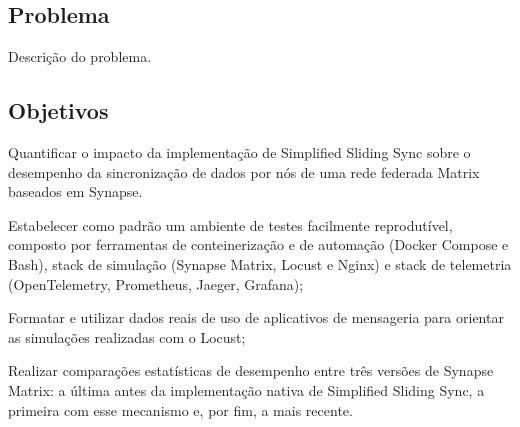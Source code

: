\subsection{Problema}

Descrição do problema.

\subsection{Objetivos}

Quantificar o impacto da implementação de Simplified Sliding Sync sobre o desempenho da sincronização de dados por nós de uma rede federada Matrix baseados em Synapse.

\begin{ufclettereditems}
    \item Estabelecer como padrão um ambiente de testes facilmente reprodutível, composto por ferramentas de conteinerização e de automação (Docker Compose e Bash), stack de simulação (Synapse Matrix, Locust e Nginx) e stack de telemetria (OpenTelemetry, Prometheus, Jaeger, Grafana); 
    \item Formatar e utilizar dados reais de uso de aplicativos de mensageria para orientar as simulações realizadas com o Locust; 
    \item Realizar comparações estatísticas de desempenho entre três versões de Synapse Matrix: a última antes da implementação nativa de Simplified Sliding Sync, a primeira com esse mecanismo e, por fim, a mais recente. 
\end{ufclettereditems}

